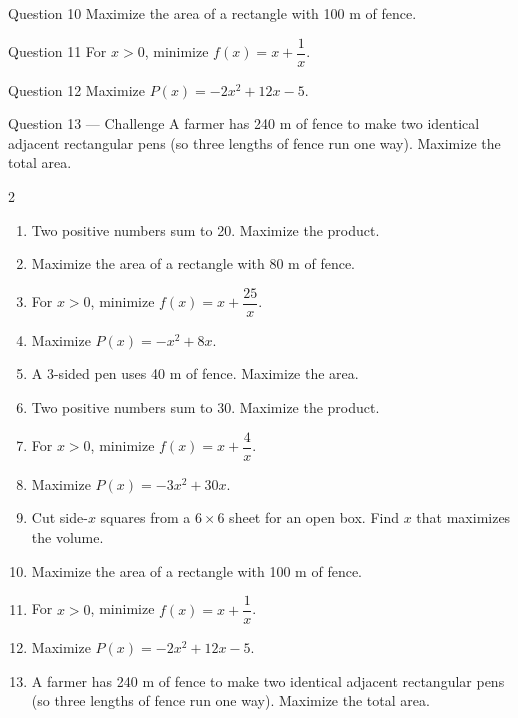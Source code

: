 \documentclass[11pt]{article}
\begin{document}
\begin{qbox}{Question 10}
Maximize the area of a rectangle with 100 m of fence.\workspace{2.4cm}
\end{qbox}

\begin{qbox}{Question 11}
For $x>0$, minimize $f(x)=x+\dfrac1{x}$.\workspace{2.4cm}
\end{qbox}

\begin{qbox}{Question 12}
Maximize $P(x)=-2x^2+12x-5$.\workspace{2.4cm}
\end{qbox}

\begin{qbox}{Question 13 --- Challenge}
A farmer has 240 m of fence to make two identical adjacent rectangular pens (so three lengths of fence run one way). Maximize the total area.\workspace{4cm}
\end{qbox}

\clearpage
{}

\begin{recapbox}
\begin{multicols}{2}
\small
\begin{enumerate}[leftmargin=*,itemsep=3pt]
  \item Two positive numbers sum to 20. Maximize the product.
  \item Maximize the area of a rectangle with 80 m of fence.
  \item For $x>0$, minimize $f(x)=x+\dfrac{25}{x}$.
  \item Maximize $P(x)=-x^2+8x$.
  \item A 3-sided pen uses 40 m of fence. Maximize the area.
  \item Two positive numbers sum to 30. Maximize the product.
  \item For $x>0$, minimize $f(x)=x+\dfrac{4}{x}$.
  \item Maximize $P(x)=-3x^2+30x$.
  \item Cut side-$x$ squares from a $6\times6$ sheet for an open box. Find $x$ that maximizes the volume.
  \item Maximize the area of a rectangle with 100 m of fence.
  \item For $x>0$, minimize $f(x)=x+\dfrac1{x}$.
  \item Maximize $P(x)=-2x^2+12x-5$.
  \item A farmer has 240 m of fence to make two identical adjacent rectangular pens (so three lengths of fence run one way). Maximize the total area.
\end{enumerate}
\end{multicols}
\end{recapbox}
\end{document}
